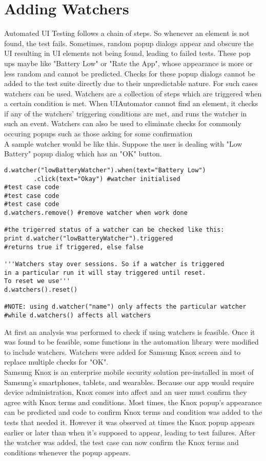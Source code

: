 \section{Adding Watchers}
Automated UI Testing follows a chain of steps. So whenever an element is not found, the test fails. Sometimes, random popup dialogs appear and obscure the UI resulting in UI elements not being found, leading to failed tests. These pop ups maybe like "Battery Low" or "Rate the App", whose appearance is more or less random and cannot be predicted. Checks for these popup dialogs cannot be added to the test suite directly due to their unpredictable nature. For such cases watchers can be used. Watchers are a collection of steps which are triggered when a certain condition is met. When UIAutomator cannot find an element, it checks if any of the watchers' triggering conditions are met, and runs the watcher in such an event\cite{uiautomatordoc}. Watchers can also be used to eliminate checks for commonly occuring popups such as those asking for some confirmation\\

A sample watcher would be like this. Suppose the user is dealing with "Low Battery" popup dialog which has an "OK" button.

\begin{lstlisting}[style=PyStyle]
d.watcher("lowBatteryWatcher").when(text="Battery Low")
		.click(text="Okay") #watcher initialised
#test case code
#test case code
#test case code
d.watchers.remove() #remove watcher when work done

#the trigerred status of a watcher can be checked like this:
print d.watcher("lowBatteryWatcher").triggered 
#returns true if triggered, else false

'''Watchers stay over sessions. So if a watcher is triggered 
in a particular run it will stay triggered until reset. 
To reset we use'''
d.watchers().reset()

#NOTE: using d.watcher("name") only affects the particular watcher 
#while d.watchers() affects all watchers
\end{lstlisting}

At first an analysis was performed to check if using watchers is feasible. Once it was found to be feasible, some functions in the automation library were modified to include watchers. Watchers were added for Samsung Knox screen and to replace multiple checks for "OK".\\ 

Samsung Knox is an enterprise mobile security solution pre-installed in most of Samsung's smartphones, tablets, and wearables. Because our app would require device administration, Knox comes into affect and an user must confirm they agree with Knox terms and conditions. Most times, the Knox popup's appearance can be predicted and code to confirm Knox terms and condition was added to the tests that needed it. However it was observed at times the Knox popup appears earlier or later than when it's supposed to appear, leading to test failures. After the watcher was added, the test case can now confirm the Knox terms and conditions whenever the popup appears.\\

